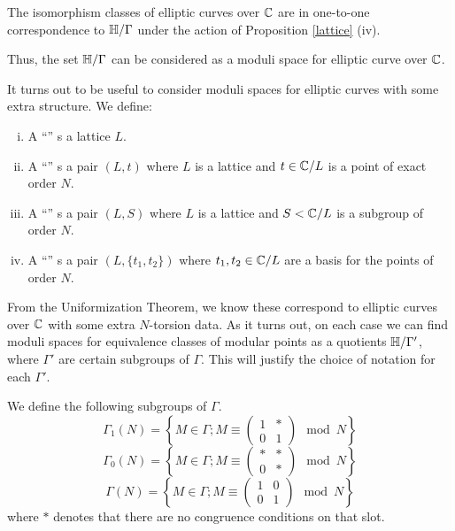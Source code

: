 \documentclass[12pt, a4paper]{report}
\begin{document}
\begin{cor}
  The isomorphism classes of elliptic curves over ${\mathbb C}$ are in one-to-one
  correspondence to $\mathbb{H}/\Gamma$ under the action of Proposition
  \autoref{lattice} (iv).
\end{cor}

Thus, the set $\mathbb{H}/\Gamma$ can be considered as a moduli space for elliptic
curve over ${\mathbb C}$. 

\begin{defn}
  It turns out to be useful to consider moduli spaces for elliptic curves with
  some extra structure. We define: 
  \begin{enumerate}[(i)]
  \item A ``'' s a lattice $L$.
  \item A ``'' s a pair $(L,t)$ where $L$ is a
    lattice and $t \in {\mathbb C}/L$ is a point of exact order $N$.
  \item A ``'' s a pair $(L,S)$ where $L$ is a
    lattice and $S < {\mathbb C}/L$ is a subgroup of order $N$.
  \item A ``'' s a pair $(L, \{t_1,t_2\})$ where
    $t_1,t_2 \in {\mathbb C}/L$ are a basis for the points of order $N$.
  \end{enumerate}
\end{defn}

From the Uniformization Theorem, we know these correspond to elliptic curves
over ${\mathbb C}$ with some extra $N$-torsion data.
As it turns out, on each case we can find moduli spaces for equivalence classes of modular
points as a quotients $\mathbb{H} / \Gamma'$, where $\Gamma'$ are certain subgroups of
$\Gamma$. This will justify the choice of notation for each $\Gamma'.$

\begin{defn}
  We define the following subgroups of $\Gamma$.
  \[\Gamma_1(N) = \left\{ 
    M \in \Gamma ; M \equiv
    \left(  
    \begin{array}{ccc}
      1 & * \\ 0 & 1
    \end{array} \right) \mod{N} \right\} 
\]
  \[\Gamma_0(N) = \left\{ 
    M \in \Gamma ; M \equiv
    \left(  
    \begin{array}{ccc}
      * & * \\ 0 & *
    \end{array} \right) \mod{N} \right\} 
\]
  \[\Gamma(N) = \left\{ 
    M \in \Gamma ; M \equiv
    \left(  
    \begin{array}{ccc}
      1 & 0 \\ 0 & 1
    \end{array} \right) \mod{N} \right\} 
\]
where $*$ denotes that there are no congruence conditions on that slot.
\end{defn}
\end{document}

